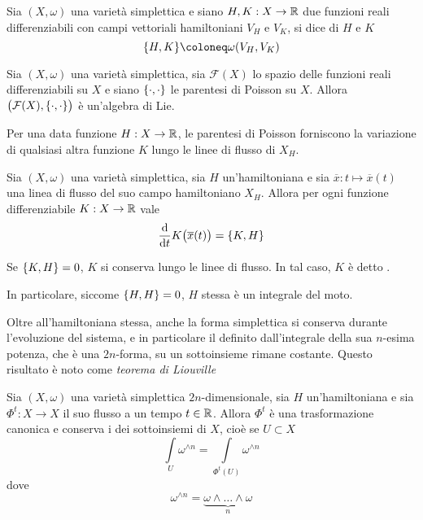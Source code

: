 \begin{definition}
  Sia $(X, \omega)$ una varietà simplettica e siano $H,K: X \to \mathbb{R}$ due funzioni reali differenziabili con campi vettoriali hamiltoniani $V_H$ e $V_K$, si dice  di $H$ e $K$ \begin{equation}
  \pb{H}{K} \defeq \omega(V_H,V_K) 
  \end{equation} 
\end{definition}
\begin{theorem}
  Sia $(X, \omega)$ una varietà simplettica, sia $\mathcal{F}(X)$ lo spazio delle funzioni reali differenziabili su $X$ e siano $\pb{\cdot}{\cdot}$ le parentesi di Poisson su $X$. Allora $\big(\mathcal{F}(X), \pb{\cdot}{\cdot}\big)$ è un'algebra di Lie.
\end{theorem}

Per una data funzione $H:X\to \mathbb{R}$, le parentesi di Poisson forniscono la variazione di qualsiasi altra funzione $K$ lungo le linee di flusso di $X_H$.
\begin{theorem}
  Sia $(X, \omega)$ una varietà simplettica, sia $H$ un'hamiltoniana e sia $\overline{x}:t \mapsto \overline{x}(t)$ una linea di flusso del suo campo hamiltoniano $X_H$. Allora per ogni funzione differenziabile $K:X\to \mathbb{R}$ vale \begin{equation}
  \dv{t} K\big(\overline{x}(t)\big) = \pb{K}{H}
  \end{equation}  
\end{theorem}
\begin{corollary}
  Se $\pb{K}{H} = 0$, $K$ si conserva lungo le linee di flusso. In tal caso, $K$ è detto .
\end{corollary}
\begin{corollary}
  In particolare, siccome $\pb{H}{H} = 0$, $H$ stessa è un integrale del moto.
\end{corollary}

Oltre all'hamiltoniana stessa, anche la forma simplettica si conserva durante l'evoluzione del sistema, e in particolare il  definito dall'integrale della sua $n$-esima potenza, che è una $2n$-forma, su un sottoinsieme rimane costante. Questo risultato è noto come \emph{teorema di Liouville}
\begin{theorem}[Liouville]
  Sia $(X, \omega)$ una varietà simplettica $2n$-dimensionale, sia $H$ un'hamiltoniana e sia $\Phi^t:X \to X$ il suo flusso a un tempo $t \in \mathbb{R}$. Allora $\Phi^t$ è una trasformazione canonica e conserva i  dei sottoinsiemi di $X$, cioè se $U \subset X$
  \begin{equation}
  \int\limits_U \omega^{\wedge n} = \int\limits_{\Phi^t(U)} \omega^{\wedge n}
  \end{equation} 
  dove 
  \begin{equation}
    \omega^{\wedge n} = \underbrace{\omega \wedge \ldots \wedge \omega}_{n}
  \end{equation} 
\end{theorem}

